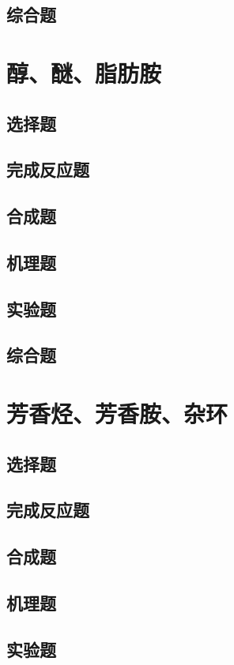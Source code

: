 \documentclass[
  10pt,
  twoside,
  openany,
  b5paper, %
  colorscheme = basic, %
]{qyxf-book}
\begin{document}
\section{综合题}

\chapter{醇、醚、脂肪胺}

\section{选择题}
\section{完成反应题}
\section{合成题}
\section{机理题}
\section{实验题}
\section{综合题}

\chapter{芳香烃、芳香胺、杂环}

\section{选择题}
\section{完成反应题}
\section{合成题}
\section{机理题}
\section{实验题}
\end{document}
